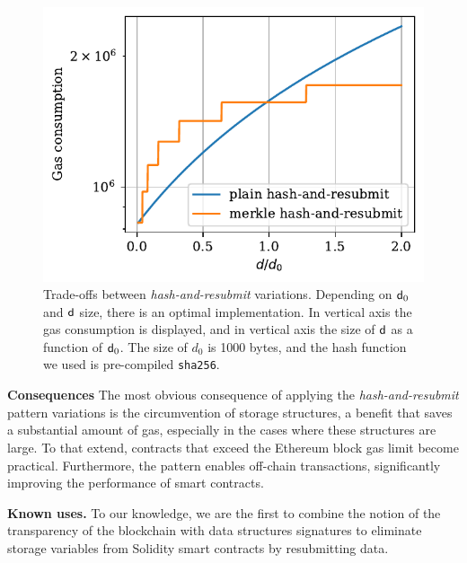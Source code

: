 \begin{figure}
    \begin{center}
        \includegraphics[width=1\columnwidth]{figures/har-vs-mhar.pdf}
    \end{center}
    \caption{Trade-offs between \emph{hash-and-resubmit} variations. Depending
    on $\mathsf{d}_0$ and $\mathsf{d}$ size, there is an optimal implementation. In
    vertical axis the gas consumption is displayed, and in vertical axis the
    size of $\mathsf{d}$ as a function of $\mathsf{d}_0$. The size of $d_0$ is 1000
    bytes, and the hash function we used is pre-compiled \texttt{sha256}.}
    \label{fig:har-vs-mhar}
\end{figure}

\noindent \textbf{Consequences} The most obvious consequence of applying the
\emph{hash-and-resubmit} pattern variations is the circumvention of storage
structures, a benefit that saves a substantial amount of gas, especially in the
cases where these structures are large. To that extend, contracts that exceed
the Ethereum block gas limit become practical. Furthermore, the pattern enables
off-chain transactions, significantly improving the performance of smart
contracts.

\noindent \textbf{Known uses.} To our knowledge, we are the first to combine
the notion of the transparency of the blockchain with data structures
signatures to eliminate storage variables from Solidity smart contracts by
resubmitting data.

